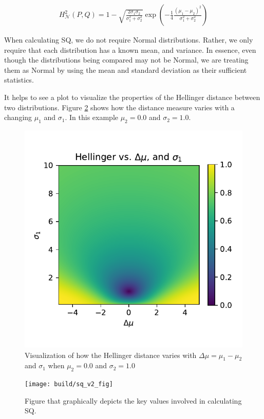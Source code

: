 \begin{align}
    H_{\mathcal{N}}^{2}(P,Q) = 1-\sqrt{\frac{2\sigma_1\sigma_2}{\sigma_1^2+\sigma_2^2}}\exp{\left(-\frac{1}{4}\frac{(\mu_1-\mu_2)^2}{\sigma_1^2+\sigma_2^2}\right)}
\end{align}

When calculating SQ, we do not require Normal distributions. Rather, we only require that each distribution has a known mean, and variance. In essence, even though the distributions being compared may not be Normal, we are treating them as Normal by using the mean and standard deviation as their sufficient statistics.

It helps to see a plot to visualize the properties of the Hellinger distance between two distributions. Figure \ref{fig:hellinger_surf} shows how the distance measure varies with a changing $\mu_1$ and $\sigma_1$. In this example $\mu_2=0.0$ and $\sigma_2=1.0$.

\begin{figure}[htbp]
    \centering
    \includegraphics[width=0.9\linewidth]{Figures/hellinger_surf}
    \caption{Visualization of how the Hellinger distance varies with $\Delta\mu=\mu_1-\mu_2$ and $\sigma_1$ when $\mu_2=0.0$ and $\sigma_2=1.0$}
    \label{fig:hellinger_surf}
\end{figure}
\begin{figure}[htbp]
    \centering
    \texttt{[image: build/sq\_v2\_fig]}
    \caption{Figure that graphically depicts the key values involved in calculating SQ.}
    \label{fig:hellinger_surf}
\end{figure}

